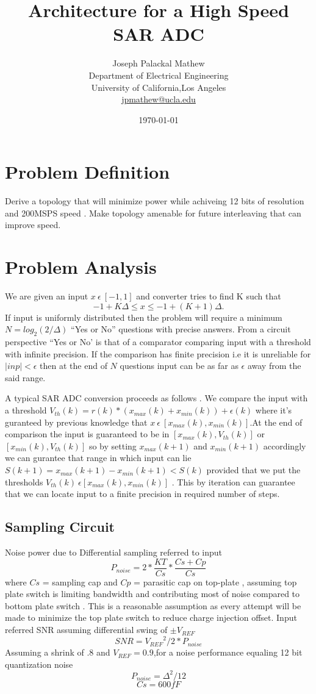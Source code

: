 \documentclass[a4paper,10pt,fleqn,titlepage,twoside]{article}
\title{Architecture for a High Speed SAR ADC}
\author{
        Joseph Palackal Mathew \\
	Department of Electrical Engineering\\
        University of California,Los Angeles\\ 
	\href{mailto:jpmathew@ucla.edi}{jpmathew@ucla.edu}
}
\date{\today}
\begin{document}
\maketitle

\section*{Problem Definition}
Derive a topology that will minimize power while achiveing 12 bits of resolution and 200MSPS speed . Make topology amenable for future interleaving 
that can improve speed.

\section*{Problem Analysis}

We are given an input $x\:\epsilon\:[-1,1]$ and converter tries to find K such that $$-1+K\Delta \leq x \leq -1+(K+1)\Delta.$$ If input
is uniformly distributed then the problem will require a minimum $N=log_2(2/\Delta)$ ``Yes or No'' questions with precise answers. From a circuit
perspective ``Yes or No' is that of a comparator comparing input with a threshold with infinite precision. If the
comparison has finite precision i.e it is unreliable for $|inp| < \epsilon $ then at the end of $N$ questions input can be as far as
$\epsilon$ away from the said range.

A typical SAR ADC conversion proceeds as follows . We compare the input with a threshold $V_{th}(k) = r(k)*(x_{max}(k)+x_{min}(k)) + \epsilon(k) $ where it's
guranteed by previous knowledge that $x\:\epsilon\:[x_{max}(k),x_{min}(k)]$.At the end of comparison the input is guaranteed to be in
$[x_{max}(k),V_{th}(k)]$ or $[x_{min}(k),V_{th}(k)]$ so by setting $x_{max}(k+1)$ and $x_{min}(k+1)$ accordingly we can gurantee that range in which 
input can lie $S(k+1)=x_{max}(k+1)-x_{min}(k+1) < S(k)$ provided that we put the thresholds  $V_{th}(k)\:\epsilon[x_{max}(k),x_{min}(k)]$ . This by iteration 
can guarantee that we can locate input to a finite precision in required number of steps.
\newpage
\subsection*{Sampling Circuit}
Noise power due to Differential sampling referred to input
$$P_{noise} = 2*\frac{KT}{Cs}*\frac{Cs+Cp}{Cs}$$
where $Cs$ = sampling cap and $Cp$ = parasitic cap on top-plate , assuming top plate switch is limiting bandwidth and contributing most of noise compared to bottom plate switch . This is a reasonable 
assumption as every attempt will be made to minimize the top plate switch to reduce charge injection offset.
Input referred SNR assuming differential swing of $\pm V_{REF}$
$$SNR = {V_{REF}}^{2}/2*P_{noise}$$
Assuming a shrink of .8 and $V_{REF} = 0.9$,for a noise performance equaling 12 bit quantization noise $$P_{noise}=\Delta^2/12$$$$Cs=600fF$$
\newpage
\end{document}
